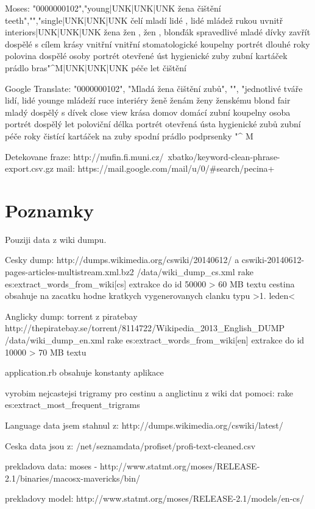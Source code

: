 Moses:
"0000000102","young|UNK|UNK|UNK žena čištění teeth","","single|UNK|UNK|UNK čelí mladí lidé , lidé mládež rukou uvnitř interiors|UNK|UNK|UNK žena žen , žen , blonďák spravedlivé mladé dívky zavřít dospělé s cílem krásy vnitřní vnitřní stomatologické koupelny portrét dlouhé roky polovina dospělé osoby portrét otevřené úst hygienické zuby zubní kartáček prádlo bras"^M|UNK|UNK|UNK péče let čištění

Google Translate:
"0000000102", "Mladá žena čištění zubů", "", "jednotlivé tváře lidí, lidé younge mládeží ruce interiéry ženě ženám ženy ženskému blond fair mladý dospělý s dívek close view krása domov domácí zubní koupelny osoba portrét dospělý let poloviční délka portrét otevřená ústa hygienické zubů zubní péče roky čistící kartáček na zuby spodní prádlo podprsenky "^ M


Detekovane fraze:
http://mufin.fi.muni.cz/~xbatko/keyword-clean-phrase-export.csv.gz
mail: https://mail.google.com/mail/u/0/#search/pecina+%




\section{Poznamky}

Pouziji data z wiki dumpu.

Cesky dump:
http://dumps.wikimedia.org/cswiki/20140612/ a cswiki-20140612-pages-articles-multistream.xml.bz2
/data/wiki_dump_cs.xml
rake es:extract_words_from_wiki[cs]
extrakce do id 50000 > 60 MB textu
cestina obsahuje na zacatku hodne kratkych vygenerovanych clanku typu >1. leden<

Anglicky dump:
torrent z piratebay http://thepiratebay.se/torrent/8114722/Wikipedia_2013_English_DUMP
/data/wiki_dump_en.xml
rake es:extract_words_from_wiki[en]
extrakce do id 10000 > 70 MB textu

application.rb obsahuje konstanty aplikace

vyrobim nejcastejsi trigramy pro cestinu a anglictinu z wiki dat pomoci:
rake es:extract_most_frequent_trigrams

Language data jsem stahnul z:
http://dumps.wikimedia.org/cswiki/latest/

Ceska data jsou z:
/net/seznamdata/profiset/profi-text-cleaned.csv

prekladova data:
moses - http://www.statmt.org/moses/RELEASE-2.1/binaries/macosx-mavericks/bin/

prekladovy model:
http://www.statmt.org/moses/RELEASE-2.1/models/en-cs/
